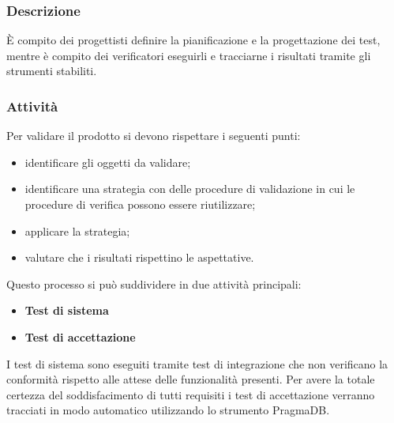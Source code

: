 	\subsubsection{Descrizione}
	\`E compito dei progettisti definire la pianificazione e la progettazione dei test, mentre è compito dei verificatori eseguirli e tracciarne i risultati tramite gli strumenti stabiliti.
	\subsubsection{Attività}
	Per validare il prodotto si devono rispettare i seguenti punti:
	\begin{itemize}
		\item identificare gli oggetti da validare;
		\item identificare una strategia con delle procedure di validazione in cui le procedure di verifica possono essere riutilizzare;
		\item applicare la strategia;
		\item valutare che i risultati rispettino le aspettative.
	\end{itemize}
	Questo processo si può suddividere in due attività principali:
	\begin{itemize}
		\item \textbf{Test di sistema}
		\item \textbf{Test di accettazione}
	\end{itemize}
	I test di sistema sono eseguiti tramite test di integrazione che non verificano la conformità rispetto alle attese delle funzionalità presenti. Per avere la totale certezza del soddisfacimento di tutti requisiti i test di accettazione verranno tracciati in modo automatico utilizzando lo strumento PragmaDB.
	